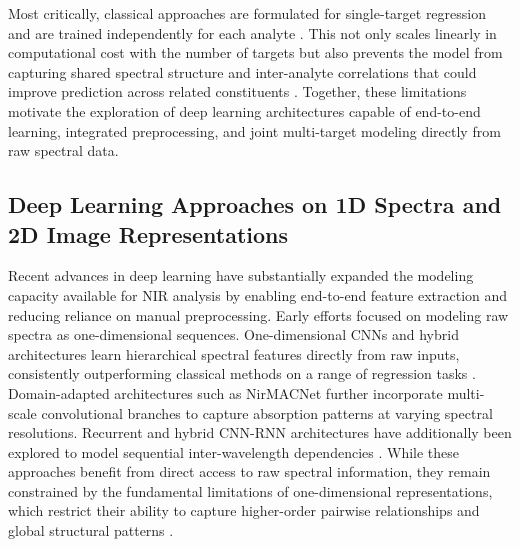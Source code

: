 \documentclass[pdflatex,sn-mathphys-num]{sn-jnl}%
\begin{document}
Most critically, classical approaches are formulated for single-target regression and are trained independently for each analyte \cite{koch2014multi, ismy2023novel}. This not only scales linearly in computational cost with the number of targets but also prevents the model from capturing shared spectral structure and inter-analyte correlations that could improve prediction across related constituents \cite{zhao2025tcunet}. Together, these limitations motivate the exploration of deep learning architectures capable of end-to-end learning, integrated preprocessing, and joint multi-target modeling directly from raw spectral data.


\subsection{Deep Learning Approaches on 1D Spectra 
and 2D Image Representations}

Recent advances in deep learning have substantially expanded the modeling capacity available for NIR analysis by enabling end-to-end feature extraction and reducing reliance on manual preprocessing. Early efforts focused on modeling raw spectra as one-dimensional sequences. One-dimensional CNNs and hybrid architectures learn hierarchical spectral features directly from raw inputs, consistently outperforming classical methods on a range of regression tasks \cite{walsh2024evaluation,li2024quantitative,zhang2019deepspectra}. Domain-adapted architectures such as NirMACNet \cite{phuong2025nirmacnet} further incorporate multi-scale convolutional branches to capture absorption patterns at varying spectral resolutions. Recurrent and hybrid CNN-RNN architectures have additionally been explored to model sequential inter-wavelength dependencies \cite{tian2025novel,yuan2022hybrid}. While these approaches benefit from direct access to raw spectral information, they remain constrained by the fundamental limitations of one-dimensional representations, which restrict their ability to capture higher-order pairwise relationships and global structural patterns \cite{deev2024spectrum,zhang2025near}.
\end{document}

